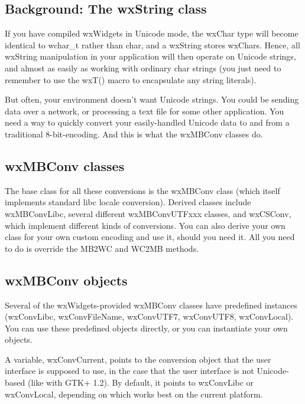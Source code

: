 \subsection{Background: The wxString class}\label{conversionandwxstring}

If you have compiled wxWidgets in Unicode mode, the wxChar type will become
identical to wchar\_t rather than char, and a wxString stores wxChars. Hence,
all wxString manipulation in your application will then operate on Unicode
strings, and almost as easily as working with ordinary char strings (you
just need to remember to use the wxT() macro to encapsulate any string
literals).

But often, your environment doesn't want Unicode strings. You could be sending
data over a network, or processing a text file for some other application. You
need a way to quickly convert your easily-handled Unicode data to and from a
traditional 8-bit-encoding. And this is what the wxMBConv classes do.

\subsection{wxMBConv classes}\label{wxmbconvclasses}

The base class for all these conversions is the wxMBConv class (which itself
implements standard libc locale conversion). Derived classes include
wxMBConvLibc, several different wxMBConvUTFxxx classes, and wxCSConv, which
implement different kinds of conversions. You can also derive your own class
for your own custom encoding and use it, should you need it. All you need to do
is override the MB2WC and WC2MB methods.

\subsection{wxMBConv objects}\label{wxmbconvobjects}

Several of the wxWidgets-provided wxMBConv classes have predefined instances
(wxConvLibc, wxConvFileName, wxConvUTF7, wxConvUTF8, wxConvLocal). You can use
these predefined objects directly, or you can instantiate your own objects.

A variable, wxConvCurrent, points to the conversion object that the user
interface is supposed to use, in the case that the user interface is not
Unicode-based (like with GTK+ 1.2). By default, it points to wxConvLibc or
wxConvLocal, depending on which works best on the current platform.

